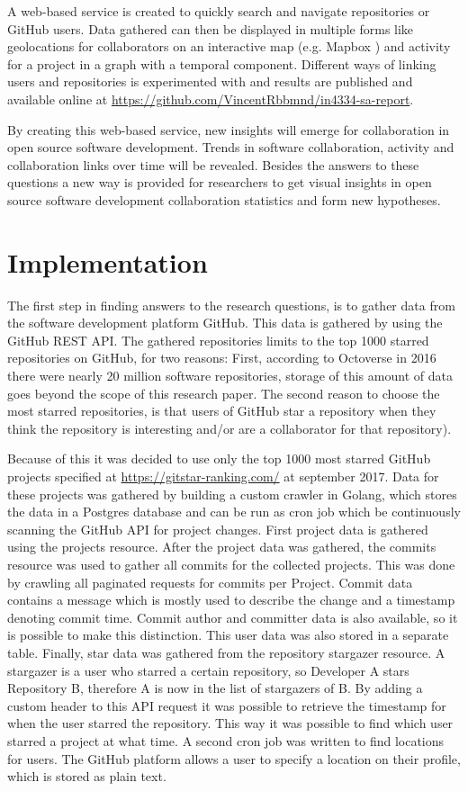\documentclass[acmtog, authorversion]{acmart}
\begin{document}
A web-based service is created to quickly search and navigate repositories or GitHub users.
Data gathered can then be displayed in multiple forms like geolocations for collaborators on an interactive map (e.g. Mapbox \cite{MapBox}) and activity for a project in a graph with a temporal component.
Different ways of linking users and repositories is experimented with and results are published and available online at \url{https://github.com/VincentRbbmnd/in4334-sa-report}.

By creating this web-based service, new insights will emerge for collaboration in open source software development.
Trends in software collaboration, activity and collaboration links over time will be revealed.
Besides the answers to these questions a new way is provided for researchers to get visual insights in open source software development collaboration statistics and form new hypotheses.

\section{Implementation}
The first step in finding answers to the research questions, is to gather data from the software development platform GitHub. 
This data is gathered by using the GitHub REST API\cite{GHAPI}. 
The gathered repositories limits to the top 1000 starred repositories on GitHub, for two reasons:
First, according to Octoverse \cite{GHOctoverse} in 2016 there were nearly 20 million software repositories, storage of this amount of data goes beyond the scope of this research paper.
The second reason to choose the most starred repositories, is that users of GitHub star a repository when they think the repository is interesting and/or are a collaborator for that repository).
 
Because of this it was decided to use only the top 1000 most starred GitHub projects specified at \url{https://gitstar-ranking.com/} at september 2017. 
Data for these projects was gathered by building a custom crawler in Golang, which stores the data in a Postgres database and can be run as cron job which be continuously scanning the GitHub API for project changes.
First project data is gathered using the projects resource\cite{GHAPI}.
After the project data was gathered, the commits resource\cite{GHAPI} was used to gather all commits for the collected projects. 
This was done by crawling all paginated requests for commits per Project. 
Commit data contains a message which is mostly used to describe the change and a timestamp denoting commit time.
Commit author and committer data is also available, so it is possible to make this distinction.
This user data was also stored in a separate table.
Finally, star data was gathered from the repository stargazer resource\cite{GHAPI}.
A stargazer is a user who starred a certain repository, so Developer A stars Repository B, therefore A is now in the list of stargazers of B.
By adding a custom header to this API request it was possible to retrieve the timestamp for when the user starred the repository.
This way it was possible to find which user starred a project at what time.
A second cron job was written to find locations for users. 
The GitHub platform allows a user to specify a location on their profile, which is stored as plain text.
\end{document}
